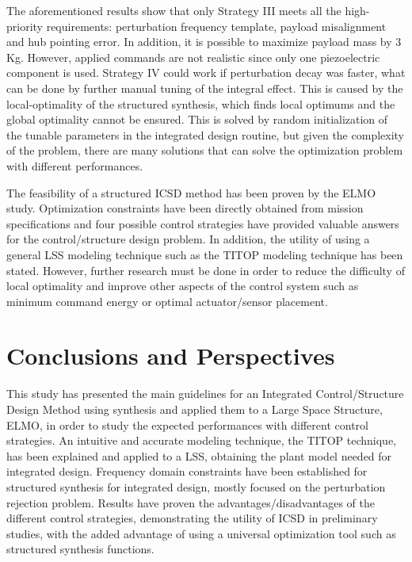 \documentclass{ifacconf}
\begin{document}
The aforementioned results show that only Strategy III meets all the high-priority requirements: perturbation frequency template, payload misalignment and hub pointing error. In addition, it is possible to maximize payload mass by 3 Kg. However, applied commands are not realistic since only one piezoelectric component is used. Strategy IV could work if perturbation decay was faster, what can be done by further manual tuning of the integral effect. This is caused by the local-optimality of the structured  synthesis, which finds local optimums and the global optimality cannot be ensured. This is solved by random initialization of the tunable parameters \citep{Gahinet2011_Hinf} in the integrated design routine, but given the complexity of the problem, there are many solutions that can solve the optimization problem with different performances.

The feasibility of a structured  ICSD method has been proven by the ELMO study. Optimization constraints have been directly obtained from mission specifications and four possible control strategies have provided valuable answers for the control/structure design problem. In addition, the utility of using a general LSS modeling technique such as the TITOP modeling technique has been stated. However, further research must be done in order to reduce the difficulty of local optimality and improve other aspects of the control system such as minimum command energy or optimal actuator/sensor placement.
 


\section{Conclusions and Perspectives}


This study has presented the main guidelines for an Integrated Control/Structure Design Method using  synthesis and applied them to a Large Space Structure, ELMO, in order to study the expected performances with different control strategies. An intuitive and accurate modeling technique, the TITOP technique, has been explained and applied to a LSS, obtaining the plant model needed for integrated design. Frequency domain constraints have been established for structured  synthesis for integrated design, mostly focused on the perturbation rejection problem. Results have proven the advantages/disadvantages of the different control strategies, demonstrating the utility of ICSD in preliminary studies, with the added advantage of using a universal optimization tool such as structured  synthesis functions. 
\end{document}
